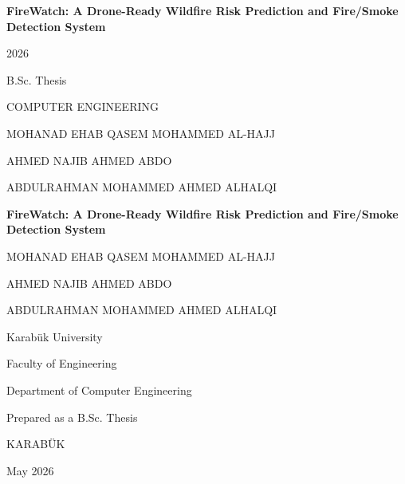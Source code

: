 \begin{titlepage}
\thispagestyle{empty}
\centering
\vspace*{2.5cm}

{\bfseries\Large
FireWatch: A Drone-Ready Wildfire Risk Prediction and Fire/Smoke Detection System
\par}

\vfill

{\large 2026\par}
\vspace{0.6cm}
{\large B.Sc. Thesis\par}
\vspace{0.6cm}
{\large COMPUTER ENGINEERING\par}

\vfill

{\large MOHANAD EHAB QASEM MOHAMMED AL-HAJJ\par}
\vspace{0.35cm}
{\large AHMED NAJIB AHMED ABDO\par}
\vspace{0.35cm}
{\large ABDULRAHMAN MOHAMMED AHMED ALHALQI\par}

\vspace*{2.5cm}
\end{titlepage}

\clearpage

\begin{titlepage}
\thispagestyle{empty}
\centering
\vspace*{2cm}

{\bfseries\Large
FireWatch: A Drone-Ready Wildfire Risk Prediction and Fire/Smoke Detection System
\par}

\vspace{2cm}

{\large MOHANAD EHAB QASEM MOHAMMED AL-HAJJ\par}
\vspace{0.35cm}
{\large AHMED NAJIB AHMED ABDO\par}
\vspace{0.35cm}
{\large ABDULRAHMAN MOHAMMED AHMED ALHALQI\par}

\vfill

{\large Karabük University\par}
\vspace{0.35cm}
{\large Faculty of Engineering\par}
\vspace{0.35cm}
{\large Department of Computer Engineering\par}

\vspace{1.5cm}

{\large Prepared as a B.Sc. Thesis\par}

\vfill

{\large KARABÜK\par}
\vspace{0.35cm}
{\large May 2026\par}

\end{titlepage}

